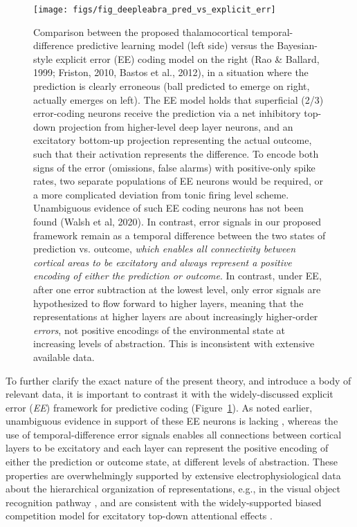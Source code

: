 \documentclass[11pt,twoside]{article}
\newif\myifpdf
\begin{document}
\begin{figure}
  \centering\texttt{[image: figs/fig\_deepleabra\_pred\_vs\_explicit\_err]}
  \caption{Comparison between the proposed thalamocortical temporal-difference predictive learning model (left side) versus the Bayesian-style explicit error (EE) coding model on the right (Rao \& Ballard, 1999; Friston, 2010, Bastos et al., 2012), in a situation where the prediction is clearly erroneous (ball predicted to emerge on right, actually emerges on left).  The EE model holds that superficial (2/3) error-coding neurons receive the prediction via a net inhibitory top-down projection from higher-level deep layer neurons, and an excitatory bottom-up projection representing the actual outcome, such that their activation represents the difference.  To encode both signs of the error (omissions, false alarms) with positive-only spike rates, two separate populations of EE neurons would be required, or a more complicated deviation from tonic firing level scheme.  Unambiguous evidence of such EE coding neurons has not been found (Walsh et al, 2020).  In contrast, error signals in our proposed framework remain as a temporal difference between the two states of prediction vs. outcome, \emph{which enables all connectivity between cortical areas to be excitatory and always represent a positive encoding of either the prediction or outcome}.  In contrast, under EE, after one error subtraction at the lowest level, only error signals are hypothesized to flow forward to higher layers, meaning that the representations at higher layers are about increasingly higher-order \emph{errors}, not positive encodings of the environmental state at increasing levels of abstraction.  This is inconsistent with extensive available data.}
  \label{fig.ee}
\end{figure}

To further clarify the exact nature of the present theory, and introduce a body of relevant data, it is important to contrast it with the widely-discussed explicit error (\emph{EE}) framework for predictive coding \citep{RaoBallard99,Friston10,BastosUsreyAdamsEtAl12,LotterKreimanCox16} (Figure~\ref{fig.ee}).  As noted earlier, unambiguous evidence in support of these EE neurons is lacking \citep{WalshMcGovernClarkEtAl20}, whereas the use of temporal-difference error signals enables all connections between cortical layers to be excitatory and each layer can represent the positive encoding of either the prediction or outcome state, at different levels of abstraction.  These properties are overwhelmingly supported by extensive electrophysiological data about the hierarchical organization of representations, e.g., in the visual object recognition pathway \citep{KobatakeTanaka94,VanRullenThorpe02,CadieuHongYaminsEtAl14}, and are consistent with the widely-supported biased competition model for excitatory top-down attentional effects \citep{DesimoneDuncan95,ReynoldsChelazziDesimone99,MillerCohen01,OReillyWyatteHerdEtAl13}.
\end{document}
